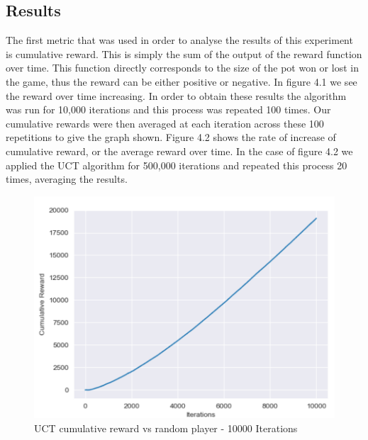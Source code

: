 \subsection{Results}\label{subsec:results1}
The first metric that was used in order to analyse the results of this experiment is cumulative reward.
This is simply the sum of the output of the reward function over time.
This function directly corresponds to the size of the pot won or lost in the game,
thus the reward can be either positive or negative.
In figure 4.1 we see the reward over time increasing.
In order to obtain these results the algorithm was run for 10,000 iterations and this process was repeated 100 times.
Our cumulative rewards were then averaged at each iteration across these 100 repetitions to give the graph shown.
Figure 4.2 shows the rate of increase of cumulative reward, or the average reward over time.
In the case of figure 4.2 we applied the UCT algorithm for 500,000 iterations and
repeated this process 20 times, averaging the results.

\begin{figure}[ht]
    \includegraphics[scale=.8]{images/cumulative_reward_mcts_vs_random.png}
    \caption{UCT cumulative reward vs random player - 10000 Iterations}
\end{figure}

